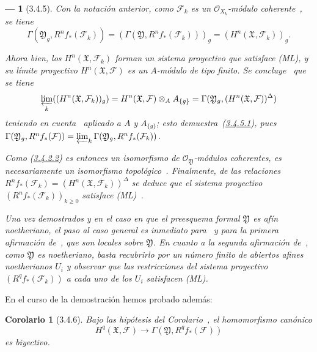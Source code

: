 \documentclass[10pt,oneside,openany]{book}
\theoremstyle{egaenv}\newtheorem*{env}{---}
\theoremstyle{egastatement}
\newtheorem*{corollary}{Corolario}
\theoremstyle{egadescription}
\renewcommand{\geq}{\geqslant}
\begin{document}
\begin{env}[3.4.5]
Con la notación anterior, como $\mathcal F_k$ es un $\mathcal O_{X_k}$-módulo coherente~, se tiene
\[
\Gamma(\mathfrak Y_g,R^nf_*(\mathcal F_k))
=(\Gamma(\mathfrak Y,R^nf_*(\mathcal F_k)))_g
=(H^n(\mathfrak X,\mathcal F_k))_g.
\]

Ahora bien, los $H^n(\mathfrak X,\mathcal F_k)$ forman un sistema proyectivo que satisface (ML), y su límite proyectivo $H^n(\mathfrak X,\mathcal F)$ es un $A$-módulo de tipo finito.
Se concluye~ que se tiene
\[
\varprojlim_k((H^n(\mathfrak X,\mathcal F_k))_g)
=H^n(\mathfrak X,\mathcal F)\otimes_AA_{\{g\}}
=\Gamma(\mathfrak Y_g,(H^n(\mathfrak X,\mathcal F))^\Delta)
\]
teniendo en cuenta~ aplicado a $A$ y $A_{\{g\}}$; esto demuestra~(\hyperref[III.3.4.5.1]{3.4.5.1}), pues $\Gamma(\mathfrak Y_g,R^nf_*(\mathcal F))
=\varprojlim_k\Gamma(\mathfrak Y_g,R^nf_*(\mathcal F_k))$.

Como (\hyperref[III.3.4.2.2]{3.4.2.2}) es entonces un isomorfismo de $\mathcal O_{\mathfrak Y}$-módulos coherentes, es necesariamente un isomorfismo \emph{topológico}~.
Finalmente, de las relaciones $R^nf_*(\mathcal F_k)=(H^n(\mathfrak X,\mathcal F_k))^\Delta$ se deduce que el sistema proyectivo $(R^nf_*(\mathcal F_k))_{k\geq0}$ satisface (ML)~.

Una vez demostrados  y  en el caso en que el preesquema formal $\mathfrak Y$ es afín noetheriano, el paso al caso general es inmediato para~ y para la primera afirmación de~, que son locales sobre $\mathfrak Y$.
En cuanto a la segunda afirmación de~, como $\mathfrak Y$ es noetheriano, basta recubrirlo por un número finito de abiertos afines noetherianos $U_i$ y observar que las restricciones del sistema proyectivo $(R^qf_*(\mathcal F_k))$ a cada uno de los $U_i$ satisfacen (ML).
\end{env}

En el curso de la demostración hemos probado además:
\begin{corollary}[3.4.6]
\label{III.3.4.6}
\label{III.3.4.6-fr}
Bajo las hipótesis del Corolario~, el homomorfismo canónico
\[
H^q(\mathfrak X,\mathcal F)
\longrightarrow\Gamma(\mathfrak Y,R^qf_*(\mathcal F))
\tag{3.4.6.1}\label{III.3.4.6.1-fr}
\]
es biyectivo.
\end{corollary}



\end{document}
